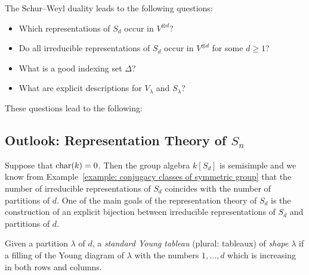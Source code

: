 \begin{fluff}
  The Schur--Weyl duality leads to the following questions:
  \begin{itemize}
    \item
      Which representations of $S_d$ occur in $V^{\otimes d}$?
    \item
      Do all irreducible representations of $S_d$ occur in $V^{\otimes d}$ for some $d \geq 1$?
    \item
      What is a good indexing set $\Delta$?
    \item
      What are explicit descriptions for $V_\lambda$ and $S_\lambda$?
  \end{itemize}
  These questions lead to the following:
\end{fluff}





\subsection*{Outlook: Representation Theory of $S_n$}


\begin{fluff}
  Suppose that $\operatorname{char}(k) = 0$.
  Then the group algebra $k[S_d]$ is semisimple and we know from Example~\ref{example: conjugacy classes of symmetric group} that the number of irreducible representations of $S_d$ coincides with the number of partitions of $d$.
  One of the main goals of the representation theory of $S_d$ is the construction of an explicit bijection between irreducible representations of $S_d$ and partitions of $d$.
\end{fluff}


\begin{definition}
  Given a partition $\lambda$ of $d$, a \emph{standard Young tableau} (plural: tableaux) of \emph{shape} $\lambda$ if a filling of the Young diagram of $\lambda$ with the numbers $1, \dotsc, d$ which is increasing in both rows and columns.
\end{definition}


